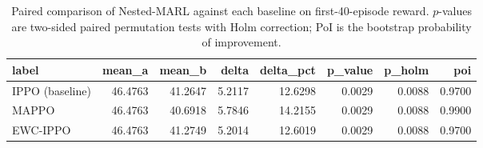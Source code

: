 \begin{table}[t]
\centering
\caption{Paired comparison of Nested-MARL against each baseline on first-40-episode reward. $p$-values are two-sided paired permutation tests with Holm correction; PoI is the bootstrap probability of improvement.}
\label{tab:headline-sig}
\footnotesize
\begin{tabular}{lrrrrrrr}
\toprule
label & mean\_a & mean\_b & delta & delta\_pct & p\_value & p\_holm & poi \\
\midrule
IPPO (baseline) & 46.4763 & 41.2647 & 5.2117 & 12.6298 & 0.0029 & 0.0088 & 0.9700 \\
MAPPO & 46.4763 & 40.6918 & 5.7846 & 14.2155 & 0.0029 & 0.0088 & 0.9900 \\
EWC-IPPO & 46.4763 & 41.2749 & 5.2014 & 12.6019 & 0.0029 & 0.0088 & 0.9700 \\
\bottomrule
\end{tabular}
\end{table}
